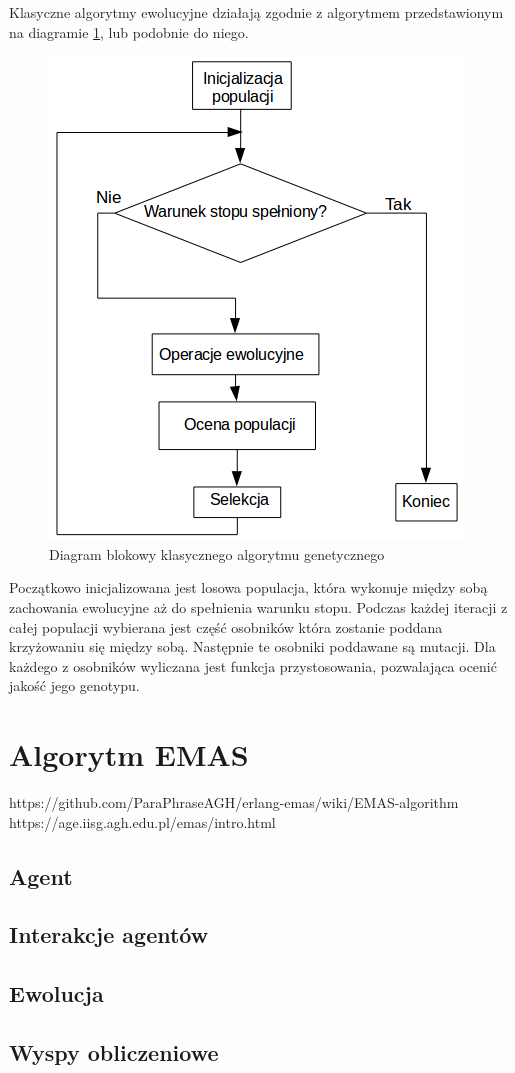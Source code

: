 Klasyczne algorytmy ewolucyjne działają zgodnie z algorytmem przedstawionym na diagramie \ref{fig:GAdiagram}, lub podobnie do niego. 

\begin{figure}[H]
\begin{center} 
\includegraphics[scale=0.6]{tresc/pics/GAdiagram.png}
\caption{Diagram blokowy klasycznego algorytmu genetycznego}
\label{fig:GAdiagram}
\end{center}
\end{figure}

Początkowo inicjalizowana jest losowa populacja, która wykonuje między sobą zachowania ewolucyjne aż do spełnienia warunku stopu. Podczas każdej iteracji z całej populacji wybierana jest część osobników która zostanie poddana krzyżowaniu się między sobą. Następnie te osobniki poddawane są mutacji. Dla każdego z osobników wyliczana jest funkcja przystosowania, pozwalająca ocenić jakość jego genotypu.

\section{Algorytm EMAS}
https://github.com/ParaPhraseAGH/erlang-emas/wiki/EMAS-algorithm
https://age.iisg.agh.edu.pl/emas/intro.html

\subsection{Agent}

\subsection{Interakcje agentów}

\subsection{Ewolucja}

\subsection{Wyspy obliczeniowe}


\label{sec:emasOpis}









